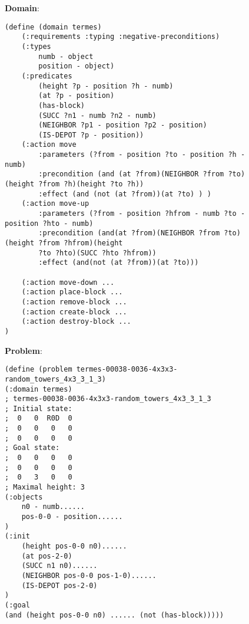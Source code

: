 \begin{figure}[h!]
\centering
\begin{tcolorbox}[title = {Termes in Planning Domain Definition Language},
   fonttitle = \bfseries, fontupper = \sffamily\tiny, fontlower = \sffamily\tiny, colframe=c1, colback=green2!5]
\textbf{Domain}:\\
\vspace{-3mm}
    \begin{lstlisting}
(define (domain termes)
    (:requirements :typing :negative-preconditions)
    (:types
        numb - object
        position - object)
    (:predicates
        (height ?p - position ?h - numb)
        (at ?p - position)
        (has-block)
        (SUCC ?n1 - numb ?n2 - numb)
        (NEIGHBOR ?p1 - position ?p2 - position)
        (IS-DEPOT ?p - position))
    (:action move
        :parameters (?from - position ?to - position ?h - numb)
        :precondition (and (at ?from)(NEIGHBOR ?from ?to)(height ?from ?h)(height ?to ?h))
        :effect (and (not (at ?from))(at ?to) ) )
    (:action move-up
        :parameters (?from - position ?hfrom - numb ?to - position ?hto - numb)
        :precondition (and(at ?from)(NEIGHBOR ?from ?to)(height ?from ?hfrom)(height 
        ?to ?hto)(SUCC ?hto ?hfrom))
        :effect (and(not (at ?from))(at ?to)))

    (:action move-down ...
    (:action place-block ...
    (:action remove-block ...
    (:action create-block ...
    (:action destroy-block ...
)
\end{lstlisting}

\textbf{Problem}:\\
\vspace{-3mm}
\begin{lstlisting}
(define (problem termes-00038-0036-4x3x3-random_towers_4x3_3_1_3)
(:domain termes)
; termes-00038-0036-4x3x3-random_towers_4x3_3_1_3
; Initial state:
;  0   0  R0D  0
;  0   0   0   0
;  0   0   0   0
; Goal state:
;  0   0   0   0
;  0   0   0   0
;  0   3   0   0
; Maximal height: 3
(:objects
    n0 - numb......
    pos-0-0 - position......
)
(:init
    (height pos-0-0 n0)......
    (at pos-2-0)
    (SUCC n1 n0)......
    (NEIGHBOR pos-0-0 pos-1-0)......
    (IS-DEPOT pos-2-0)
)
(:goal
(and (height pos-0-0 n0) ...... (not (has-block)))))
\end{lstlisting}

\label{tbox:termes_pddl} 
\end{tcolorbox}
\end{figure}


